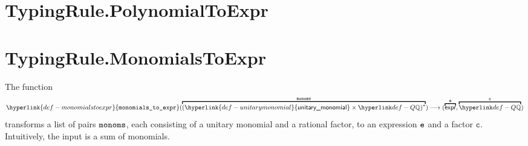 \documentclass{book}
\newcommand\annotaterel[0]{\hyperlink{def-annotaterel}{\textsf{type}}}
\newcommand\typearrow[0]{\xrightarrow{\annotaterel}}
\newcommand\polynomialtoexpr[0]{\hyperlink{def-polynomialtoexpr}{\texttt{polynomial\_to\_expr}}}
\newcommand\monomialtoexpr[0]{\hyperlink{def-monomialtoexpr}{\texttt{monomial\_to\_expr}}}
\newcommand\symaddexpr[0]{\hyperlink{def-symaddexpr}{\texttt{sym\_add\_expr}}}
\newcommand\monomialstoexpr[0]{\hyperlink{def-monomialstoexpr}{\texttt{monomials\_to\_expr}}}
\newcommand\Sum[0]{\hyperlink{def-sum}{\textsf{Sum}}}
\newcommand\unitarymonomial[0]{\hyperlink{def-unitarymonomial}{\textsf{unitary\_monomial}}}
\newcommand\vc[0]{\texttt{c}}
\newcommand\vm[0]{\texttt{m}}
\newcommand\vp[0]{\texttt{p}}
\newcommand\veone[0]{\texttt{e1}}
\newcommand\vetwo[0]{\texttt{e2}}
\begin{document}
\section{TypingRule.PolynomialToExpr \label{sec:TypingRule.PolynomialToExpr}}
\hypertarget{def-polynomialtoexpr}{}

\newcommand\funcgraph[0]{\hyperlink{def-funcgraph}{\texttt{func\_graph}}}
\newcommand\sort[0]{\hyperlink{def-sort}{\texttt{sort}}}
\newcommand\comparemonomialbindings[0]{\hyperlink{def-comparemonomialbindings}{\texttt{compare\_monomial\_bindings}}}
\newcommand\comparemonomebindings[0]{\hyperlink{def-comparemonomebindings}{\texttt{compare\_monome\_bindings}}}


\section{TypingRule.MonomialsToExpr \label{sec:TypingRule.MonomialsToExpr}}
\hypertarget{def-monomialstoexpr}{}
The function
\[
\monomialstoexpr(\overname{(\unitarymonomial\times\Q)^*}{\monoms}) \aslto (\overname{\expr}{\ve},\overname{\Q}{\vc})
\]
transforms a list of pairs $\texttt{monoms}$, each consisting of a unitary monomial and a rational factor, to an expression $\texttt{e}$
and a factor $\vc$.
Intuitively, the input is a sum of monomials.
\end{document}

